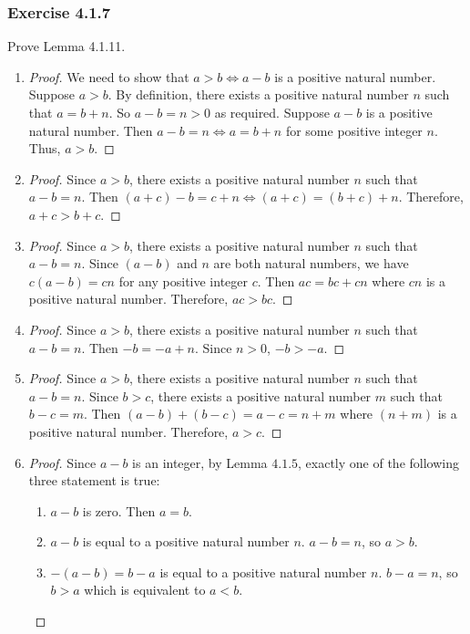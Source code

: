 \documentclass[12pt, letter]{article}
\begin{document}
\subsubsection*{Exercise 4.1.7}
Prove Lemma 4.1.11.
\begin{enumerate}[label=(\alph*)]
    \item \begin{proof}
        We need to show that $a>b\iff a-b$ is a positive natural number. Suppose $a>b$. By definition, there exists a positive natural number $n$ such that 
        $a=b+n$. So $a-b=n>0$ as required. Suppose $a-b$ is a positive natural number. Then $a-b=n\iff a=b+n$ for some positive integer $n$. Thus, $a>b$.
    \end{proof}
    \item \begin{proof}
        Since $a>b$, there exists a positive natural number $n$ such that $a-b=n$. Then $(a+c)-b=c+n\iff (a+c)=(b+c)+n$. Therefore, $a+c>b+c$.
    \end{proof} 
    \item \begin{proof}
        Since $a>b$, there exists a positive natural number $n$ such that $a-b=n$. Since $(a-b)$ and $n$ are both natural numbers, we have $c(a-b)=cn$ for any positive integer $c$.
        Then $ac=bc+cn$ where $cn$ is a positive natural number. Therefore, $ac>bc$.
    \end{proof}
    \item \begin{proof}
        Since $a>b$, there exists a positive natural number $n$ such that $a-b=n$. Then $-b=-a+n$. Since $n>0$, $-b>-a$.
    \end{proof}
    \item \begin{proof}
        Since $a>b$, there exists a positive natural number $n$ such that $a-b=n$. Since $b>c$, there exists a positive natural number $m$ such that $b-c=m$.
        Then $(a-b)+(b-c)=a-c=n+m$ where $(n+m)$ is a positive natural number. Therefore, $a>c$. 
    \end{proof}
    \item \begin{proof}
        Since $a-b$ is an integer, by Lemma $4.1.5$, exactly one of the following three statement is true:
        \begin{enumerate}[label=(\alph*)]
            \item $a-b$ is zero. Then $a=b$.
            \item $a-b$ is equal to a positive natural number $n$. $a-b=n$, so $a>b$.
            \item $-(a-b)=b-a$ is equal to a positive natural number $n$. $b-a=n$, so $b>a$ which is equivalent to $a<b$. 
        \end{enumerate}
    \end{proof}
\end{enumerate}
\end{document}
